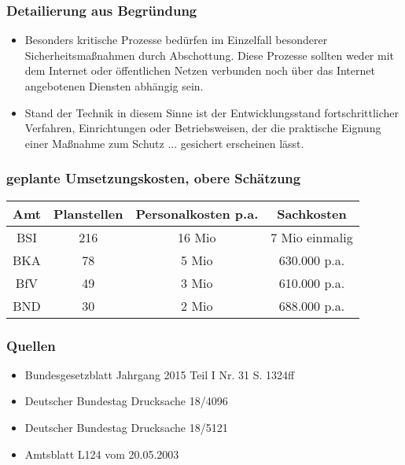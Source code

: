 \documentclass[11pt]{beamer}
\begin{document}
	\begin{frame}
		\frametitle{Detailierung aus Begründung}
		\begin{itemize}
			\item Besonders kritische Prozesse bedürfen im Einzelfall besonderer Sicherheitsmaßnahmen durch Abschottung. Diese Prozesse sollten weder mit dem Internet oder öffentlichen Netzen verbunden noch über das Internet angebotenen Diensten abhängig sein.
			\item Stand der Technik in diesem Sinne ist der Entwicklungsstand fortschrittlicher Verfahren, Einrichtungen oder Betriebsweisen, der die praktische Eignung einer Maßnahme zum Schutz ... gesichert erscheinen lässt.
		\end{itemize}
	\end{frame}
	

	\begin{frame}
		\frametitle{geplante Umsetzungskosten, obere Schätzung}
		\begin{tabular}{|c|c|c|c|}
			\hline \rule[-2ex]{0pt}{5.5ex} Amt & Planstellen & Personalkosten p.a. & Sachkosten \\ 
			\hline \rule[-2ex]{0pt}{5.5ex} BSI & 216 & 16 Mio & 7 Mio einmalig \\ 
			\hline \rule[-2ex]{0pt}{5.5ex} BKA & 78 & 5 Mio & 630.000 p.a. \\ 
			\hline \rule[-2ex]{0pt}{5.5ex} BfV & 49 & 3 Mio & 610.000 p.a. \\ 
			\hline \rule[-2ex]{0pt}{5.5ex} BND & 30 & 2 Mio & 688.000 p.a. \\ 
			\hline 
		\end{tabular} 
	\end{frame}

	\begin{frame}
		\frametitle{Quellen}
		\begin{itemize}
			\item Bundesgesetzblatt Jahrgang 2015 Teil I Nr. 31 S. 1324ff
			\item Deutscher Bundestag Drucksache 18/4096
			\item Deutscher Bundestag Drucksache 18/5121
			\item Amtsblatt L124 vom 20.05.2003
		\end{itemize}
	\end{frame}
		
\end{document}
